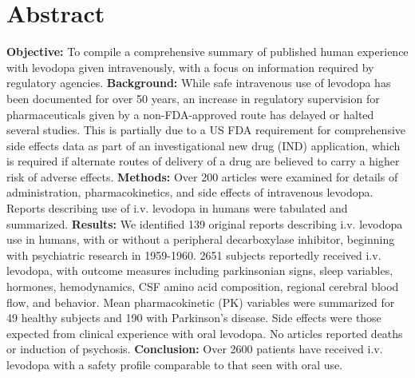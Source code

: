 \section{Abstract}
\textbf{Objective:} To compile a comprehensive summary of published human experience with levodopa given intravenously, with a focus on information required by regulatory agencies.
\textbf{Background:} While safe intravenous use of levodopa has been documented for over 50 years, an increase in regulatory supervision for pharmaceuticals given by a non-FDA-approved route has delayed or halted several studies. This is partially due to a US FDA requirement for comprehensive side effects data as part of an investigational new drug (IND) application, which is required if alternate routes of delivery of a drug are believed to carry a higher risk of adverse effects.
\textbf{Methods:} Over 200 articles were examined for details of administration, pharmacokinetics, and side effects of intravenous levodopa. Reports describing use of i.v. levodopa in humans were tabulated and summarized.
\textbf{Results:} We identiﬁed 139 original reports describing i.v. levodopa use in humans, with or without a peripheral decarboxylase inhibitor, beginning with psychiatric research in 1959-1960. 2651 subjects reportedly received i.v. levodopa, with outcome measures including parkinsonian signs, sleep variables, hormones, hemodynamics, CSF amino acid composition, regional cerebral blood ﬂow, and behavior. Mean pharmacokinetic (PK) variables were summarized for 49 healthy subjects and 190 with Parkinson's disease. Side effects were those expected from clinical experience with oral levodopa. No articles reported deaths or induction of psychosis.
\textbf{Conclusion:} Over 2600 patients have received i.v. levodopa with a safety profile comparable to that seen with oral use.